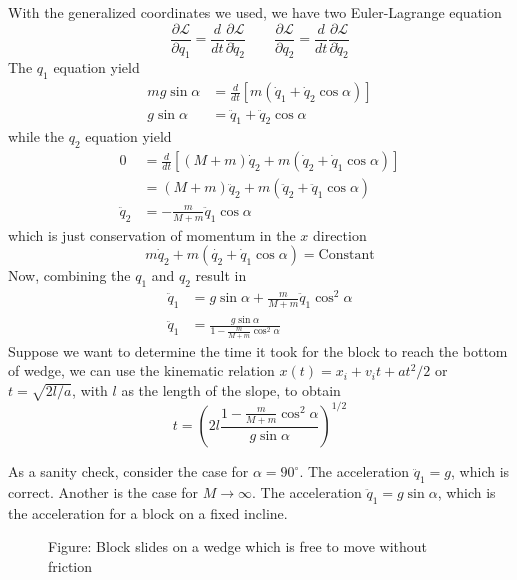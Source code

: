 \documentclass[../../../main.tex]{subfiles}
\begin{document}
With the generalized coordinates we used, we have two Euler-Lagrange equation
\begin{equation*}
	\frac{\partial \mathcal{L}}{\partial q_1}=\frac{d}{dt}\frac{\partial \mathcal{L}}{\partial \dot{q}_2}\qquad\frac{\partial \mathcal{L}}{\partial q_2}=\frac{d}{dt}\frac{\partial \mathcal{L}}{\partial \dot{q}_2}
\end{equation*}
The $q_1$ equation yield
\begin{align*}
	mg\sin\alpha & =\frac{d}{dt}\left[m(\dot{q}_1+\dot{q}_2\cos\alpha)\right] \\
	g\sin\alpha  & =\ddot{q}_1+\ddot{q}_2\cos\alpha
\end{align*}
while the $q_2$ equation yield
\begin{align*}
	0          & =\frac{d}{dt}\left[(M+m)\dot{q}_2+m(\dot{q}_2+\dot{q}_1\cos\alpha)\right] \\
	           & =(M+m)\ddot{q}_2+m(\ddot{q}_2+\ddot{q}_1\cos\alpha)                       \\
	\ddot{q}_2 & =-\frac{m}{M+m}\ddot{q}_1\cos\alpha
\end{align*}
which is just conservation of momentum in the $x$ direction
\begin{equation*}
	m\dot{q}_2+m\left(\dot{q_2}+\dot{q}_1\cos\alpha\right)=\text{Constant}
\end{equation*}
Now, combining the $q_1$ and $q_2$ result in
\begin{align*}
	\ddot{q}_1 & =g\sin\alpha+\frac{m}{M+m}\ddot{q}_1\cos^2\alpha \\
	\ddot{q}_1 & =\frac{g\sin\alpha}{1-\frac{m}{M+m}\cos^2\alpha}
\end{align*}
Suppose we want to determine the time it took for the block to reach the bottom of wedge, we can use the kinematic relation $x(t)=x_i+v_it+at^2/2$ or $t=\sqrt{2l/a}$, with $l$ as the length of the slope, to obtain
\begin{equation*}
	t=\left(2l\frac{1-\frac{m}{M+m}\cos^2\alpha}{g\sin\alpha}\right)^{1/2}
\end{equation*}

As a sanity check, consider the case for $\alpha=90^\circ$.
The acceleration $\ddot{q}_1=g$, which is correct.
Another is the case for $M\rightarrow\infty$.
The acceleration $\ddot{q}_1=g\sin\alpha$, which is the acceleration for a block on a fixed incline.

\begin{figure*}
	\centering
	\caption*{Figure: Block slides on a wedge which is free to move without friction}
\end{figure*}
\end{document}
